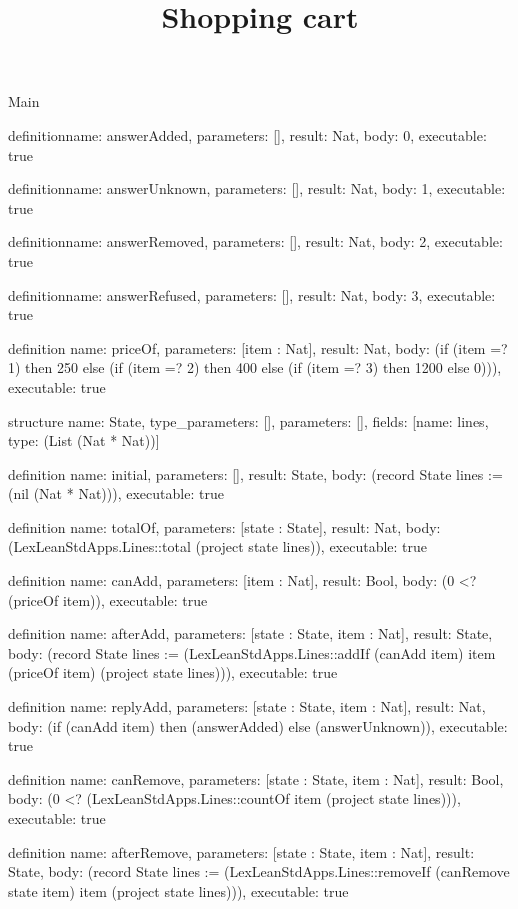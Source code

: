 \begin{lexlean}{Main}
\title{Shopping cart}
\begin{semanticmodule}
definition{name: answerAdded, parameters: [], result: Nat, body: 0, executable: true}

definition{name: answerUnknown, parameters: [], result: Nat, body: 1, executable: true}

definition{name: answerRemoved, parameters: [], result: Nat, body: 2, executable: true}

definition{name: answerRefused, parameters: [], result: Nat, body: 3, executable: true}

definition{
  name: priceOf,
  parameters: [item : Nat],
  result: Nat,
  body: (if (item =? 1) then 250 else (if (item =? 2) then 400 else (if (item =? 3) then 1200 else 0))),
  executable: true
}

structure{
  name: State,
  type_parameters: [],
  parameters: [],
  fields: [{name: lines, type: (List (Nat * Nat))}]
}

definition{
  name: initial,
  parameters: [],
  result: State,
  body: (record State {lines := (nil (Nat * Nat))}),
  executable: true
}

definition{
  name: totalOf,
  parameters: [state : State],
  result: Nat,
  body: (LexLeanStdApps.Lines::total (project state lines)),
  executable: true
}

definition{
  name: canAdd,
  parameters: [item : Nat],
  result: Bool,
  body: (0 <? (priceOf item)),
  executable: true
}

definition{
  name: afterAdd,
  parameters: [state : State, item : Nat],
  result: State,
  body: (record State {lines := (LexLeanStdApps.Lines::addIf (canAdd item) item (priceOf item) (project state lines))}),
  executable: true
}

definition{
  name: replyAdd,
  parameters: [state : State, item : Nat],
  result: Nat,
  body: (if (canAdd item) then (answerAdded) else (answerUnknown)),
  executable: true
}

definition{
  name: canRemove,
  parameters: [state : State, item : Nat],
  result: Bool,
  body: (0 <? (LexLeanStdApps.Lines::countOf item (project state lines))),
  executable: true
}

definition{
  name: afterRemove,
  parameters: [state : State, item : Nat],
  result: State,
  body: (record State {lines := (LexLeanStdApps.Lines::removeIf (canRemove state item) item (project state lines))}),
  executable: true
}


\end{semanticmodule}
\end{lexlean}
